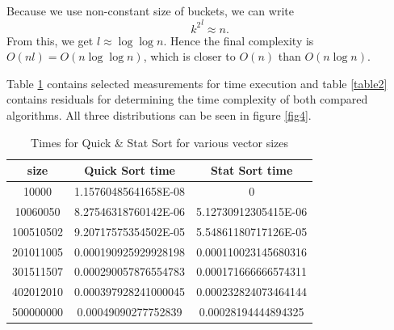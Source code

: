 \documentclass[12pt]{article}
\begin{document}
        Because we use non-constant size of buckets, we can write
        \[
        {k^2}^l \approx n.
        \]
        From this, we get $l \approx \log \log n$. Hence the final complexity is $O(n l) = O(n \log \log n)$, which is closer to $O(n)$ than $O(n \log n)$.
			
		Table \ref{table1} contains selected measurements for time execution and table \ref{table2} contains residuals for determining the time complexity of both compared algorithms. All three distributions can be seen in figure \ref{fig4}.
		
		\begin{table}
		\caption{Times for Quick \& Stat Sort for various vector sizes}
		\begin{center}
		\begin{tabular}{ |c|c|c| }
		
		\hline
		
		size & Quick Sort time & Stat Sort time \\

		\hline\hline		
		
		10000		& 1.15760485641658E-08	& 0 \\
		10060050    & 8.27546318760142E-06	& 5.12730912305415E-06 \\
		100510502	& 9.20717575354502E-05	& 5.54861180717126E-05 \\
		201011005	& 0.000190925929928198	& 0.000110023145680316 \\
		301511507	& 0.000290057876554783	& 0.000171666666574311 \\
		402012010	& 0.000397928241000045	& 0.000232824073464144 \\
		500000000	& 0.00049090277752839	& 0.00028194444894325 \\

		\hline
		\end{tabular}
		\end{center}
		\label{table1}
		\end{table}
\end{document}
